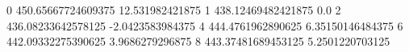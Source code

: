 0 450.65667724609375 12.531982421875
1 438.12469482421875 0.0
2 436.08233642578125 -2.0423583984375
4 444.4761962890625 6.35150146484375
6 442.09332275390625 3.9686279296875
8 443.37481689453125 5.2501220703125
